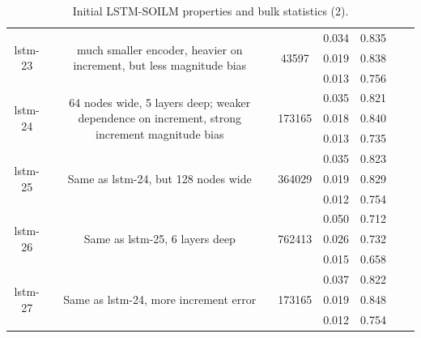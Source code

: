 \begin{table}[H]
\begin{sideways}
\begin{tabular}{c|c|c|c|c|c|c }
\hline
\multirow{3}{6em}{lstm-23} & \multirow{3}{16em}{much smaller encoder, heavier on increment, but less magnitude bias} & \multirow{3}{4em}{43597} & 0.034 & 0.835 &  &  \\ & & & 0.019 & 0.838 &  &  \\ & & & 0.013 & 0.756 &  &  \\
\hline
\multirow{3}{6em}{lstm-24} & \multirow{3}{16em}{64 nodes wide, 5 layers deep; weaker dependence on increment, strong increment magnitude bias} & \multirow{3}{4em}{173165} & 0.035 & 0.821 &  &  \\ & & & 0.018 & 0.840 &  &  \\ & & & 0.013 & 0.735 &  &  \\
\hline
\multirow{3}{6em}{lstm-25} & \multirow{3}{16em}{Same as lstm-24, but 128 nodes wide} & \multirow{3}{4em}{364029} & 0.035 & 0.823 &  &  \\ & & & 0.019 & 0.829 &  &  \\ & & & 0.012 & 0.754 &  &  \\
\hline
\multirow{3}{6em}{lstm-26} & \multirow{3}{16em}{Same as lstm-25, 6 layers deep} & \multirow{3}{4em}{762413} & 0.050 & 0.712 &  &  \\ & & & 0.026 & 0.732 &  &  \\ & & & 0.015 & 0.658 &  &  \\
\hline
\multirow{3}{6em}{lstm-27} & \multirow{3}{16em}{Same as lstm-24, more increment error} & \multirow{3}{4em}{173165} & 0.037 & 0.822 &  &  \\ & & & 0.019 & 0.848 &  &  \\ & & & 0.012 & 0.754 &  &  \\
    \end{tabular}
\centering
\end{sideways}
    \caption{Initial LSTM-SOILM properties and bulk statistics (2).}
    \label{model-init-lstm-table-2}
\end{table}

